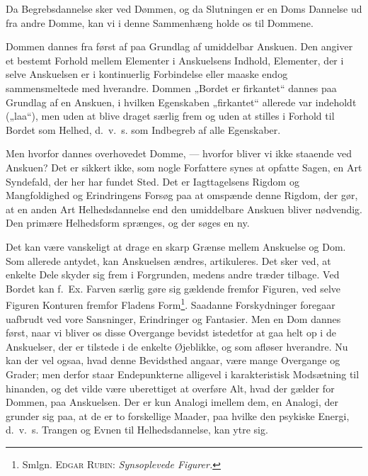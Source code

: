 \documentclass[12pt]{article}
\begin{document}
Da Begrebsdannelse sker ved Dømmen, og da Slutningen er en Doms Dannelse ud fra
andre Domme, kan vi i denne Sammenhæng holde os til Dommene.

Dommen dannes fra først af paa Grundlag af umiddelbar Anskuen. Den angiver et
bestemt Forhold mellem Elementer i Anskuelsens Indhold, Elementer, der i selve
Anskuelsen er i kontinuerlig Forbindelse eller maaske endog sammensmeltede med
hverandre. Dommen „Bordet er firkantet“ dannes paa Grundlag af en Anskuen, i
hvilken Egenskaben „firkantet“ allerede var indeholdt („laa“), men uden at
blive draget særlig frem og uden at stilles i Forhold til Bordet som Helhed,
d.~v.~s. som Indbegreb af alle Egenskaber.

Men hvorfor dannes overhovedet Domme, --- hvorfor bliver vi ikke staaende ved
Anskuen? Det er sikkert ikke, som nogle Forfattere synes at opfatte Sagen, en
Art Syndefald, der her har fundet Sted. Det er Iagttagelsens Rigdom og
Mangfoldighed og Erindringens Forsøg paa at omspænde denne Rigdom, der gør, at
en anden Art Helhedsdannelse end den umiddelbare Anskuen bliver nødvendig. Den
primære Helhedsform sprænges, og der søges en ny.

Det kan være vanskeligt at drage en skarp Grænse mellem Anskuelse og Dom. Som
allerede antydet, kan Anskuelsen ændres, artikuleres. Det sker ved, at enkelte
Dele skyder sig frem i Forgrunden, medens andre træder tilbage. Ved Bordet kan
f.~Ex. Farven særlig gøre sig gældende fremfor Figuren, ved selve Figuren
Konturen fremfor Fladens Form\footnote{Smlgn. \textsc{Edgar Rubin}:
\textit{Synsoplevede Figurer.}}. Saadanne Forskydninger foregaar uafbrudt ved
vore Sansninger, Erindringer og Fantasier. Men en Dom dannes først, naar vi
bliver os disse Overgange bevidst istedetfor at gaa helt op i de Anskuelser,
der er tilstede i de enkelte Øjeblikke, og som afløser hverandre. Nu kan der vel
ogsaa, hvad denne Bevidsthed angaar, være mange Overgange og Grader; men derfor
staar Endepunkterne alligevel i karakteristisk Modsætning til hinanden, og det
vilde være uberettiget at overføre Alt, hvad der gælder for Dommen, paa
Anskuelsen. Der er kun Analogi imellem dem, en Analogi, der grunder sig paa, at
de er to forskellige Maader, paa hvilke den psykiske Energi, d.~v.~s. Trangen
og Evnen til Helhedsdannelse, kan ytre sig.
\end{document}
